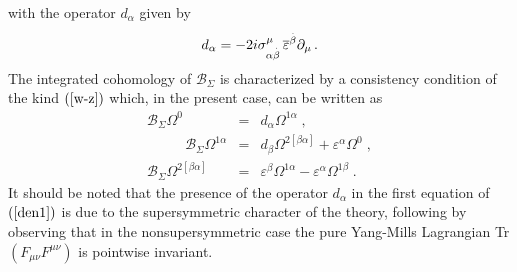 \documentclass[a4paper,12pt]{article}
\begin{document}
with the operator $d_{\alpha }$ given by 
\begin{equation}
d_{\alpha }=-2i\sigma _{\alpha \stackrel{.}{\beta }}^{\mu }\,\overline{%
\varepsilon }^{\stackrel{.}{\beta }}\partial _{\mu }\,.  \label{dan1}
\end{equation}
The integrated cohomology of $\mathcal{B}_{\Sigma }$ is characterized by a
consistency condition of the kind $\left( \ref{w-z}\right) $ which, in the
present case, can be written as \cite{ul} 
\begin{eqnarray}
\mathcal{B}_{\Sigma }\Omega ^{0} &=&d_{\alpha }\Omega ^{1\alpha }\;, 
\nonumber \\
\,\,\,\,\,\,\,\,\;\;\;\;\;\mathcal{B}_{\Sigma }\Omega ^{1\alpha }
&=&d_{\beta }\Omega ^{2[\beta \alpha ]}+\varepsilon ^{\alpha }\Omega ^{0}\;,
\nonumber \\
\mathcal{B}_{\Sigma }\Omega ^{2[\beta \alpha ]} &=&\varepsilon ^{\beta
}\Omega ^{1\alpha }-\varepsilon ^{\alpha }\Omega ^{1\beta }\;.  \label{den1}
\end{eqnarray}
It should be noted that the presence of the operator $d_{\alpha }$ in the
first equation of $\left( \ref{den1}\right) $ is due to the supersymmetric
character of the theory, following by observing that in the
nonsupersymmetric case the pure Yang-Mills Lagrangian \textrm{Tr}$\left(
F_{\mu \nu }F^{\mu \nu }\right) $ is pointwise invariant.
\end{document}
